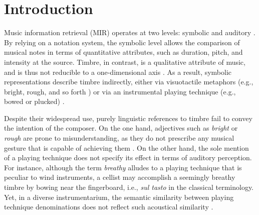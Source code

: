 \documentclass{bmcart}
\makeatletter
\newcommand*{\eg}{e.g.,\@\xspace}
\makeatother
\begin{document}




\section*{Introduction}
\label{sec:intro}

Music information retrieval (MIR) operates at two levels: symbolic and auditory \cite{downie2003mir}.
By relying on a notation system, the symbolic level allows the comparison of musical notes in terms of quantitative attributes, such as duration, pitch, and intensity at the source.
Timbre, in contrast, is a qualitative attribute of music, and is thus not reducible to a one-dimensional axis \cite{siedenburg2019chapter}.
As a result, symbolic representations describe timbre indirectly, either via visuotactile metaphors (\eg{} bright, rough, and so forth \cite{faure1996icmpc}) or via an instrumental playing technique (\eg{} bowed or plucked) \cite{lostanlen2018extended}.

Despite their widespread use, purely linguistic references to timbre fail to convey the intention of the composer.
On the one hand, adjectives such as \emph{bright} or \emph{rough} are prone to misunderstanding, as they do not prescribe any musical gesture that is capable of achieving them \cite{antoine2018isma}.
On the other hand, the sole mention of a playing technique does not specify its effect in terms of auditory perception.
For instance, although the term \emph{breathy} alludes to a playing technique that is peculiar to wind instruments, a cellist may accomplish a seemingly breathy timbre by bowing near the fingerboard, i.e., \emph{sul tasto} in the classical terminology.
Yet, in a diverse instrumentarium, the semantic similarity between playing technique denominations does not reflect such acoustical similarity \cite{kolozali2011ismir}.
\end{document}
